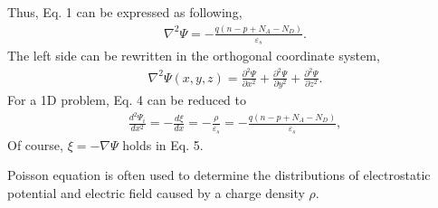 \documentclass[a4paper,10pt,english]{sphinxmanual}
\begin{document}
\sphinxAtStartPar
Thus, Eq. 1 can be expressed as following,
\begin{equation*}
\begin{split}\nabla^2\Psi = -\frac{q(n - p + N_A - N_D)}{\varepsilon_s}\tag{3}.\end{split}
\end{equation*}
\sphinxAtStartPar
The left side can be rewritten in the orthogonal coordinate system,
\begin{equation*}
\begin{split}\nabla^2\Psi(x, y, z) = \frac{\partial^2\Psi}{\partial x^2} + \frac{\partial^2\Psi}{\partial y^2} + \frac{\partial^2\Psi}{\partial z^2}\tag{4}.\end{split}
\end{equation*}
\sphinxAtStartPar
For a 1D problem, Eq. 4 can be reduced to
\begin{equation*}
\begin{split}\frac{d^2\Psi_i}{d x^2} = -\frac{d\xi}{dx} = -\frac{\rho}{\varepsilon_s} =  -\frac{q(n - p + N_A - N_D)}{\varepsilon_s},\tag{5}\end{split}
\end{equation*}
\sphinxAtStartPar
Of course, \(\xi = - \nabla\Psi\) holds in Eq. 5.

\sphinxAtStartPar
Poisson equation is often used to determine the distributions of electrostatic potential and electric field caused by a charge density \(\rho\).
\end{document}
